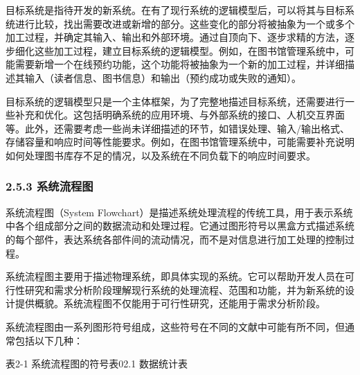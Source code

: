 
目标系统是指待开发的新系统。在有了现行系统的逻辑模型后，可以将其与目标系统进行比较，找出需要改进或新增的部分。这些变化的部分将被抽象为一个或多个加工过程，并确定其输入、输出和外部环境。通过自顶向下、逐步求精的方法，逐步细化这些加工过程，建立目标系统的逻辑模型。例如，在图书馆管理系统中，可能需要新增一个在线预约功能，这个功能将被抽象为一个新的加工过程，并详细描述其输入（读者信息、图书信息）和输出（预约成功或失败的通知）。


目标系统的逻辑模型只是一个主体框架，为了完整地描述目标系统，还需要进行一些补充和优化。这包括明确系统的应用环境、与外部系统的接口、人机交互界面等。此外，还需要考虑一些尚未详细描述的环节，如错误处理、输入/输出格式、存储容量和响应时间等性能要求。例如，在图书馆管理系统中，可能需要补充说明如何处理图书库存不足的情况，以及系统在不同负载下的响应时间要求。

\hypertarget{ux7cfbux7edfux6d41ux7a0bux56fe}{%
\subsubsection{2.5.3 系统流程图}\label{ux7cfbux7edfux6d41ux7a0bux56fe}}

系统流程图（System Flowchart）是描述系统处理流程的传统工具，用于表示系统中各个组成部分之间的数据流动和处理过程。它通过图形符号以黑盒方式描述系统的每个部件，表达系统各部件间的流动情况，而不是对信息进行加工处理的控制过程。


系统流程图主要用于描述物理系统，即具体实现的系统。它可以帮助开发人员在可行性研究和需求分析阶段理解现行系统的处理流程、范围和功能，并为新系统的设计提供概貌。系统流程图不仅能用于可行性研究，还能用于需求分析阶段。


系统流程图由一系列图形符号组成，这些符号在不同的文献中可能有所不同，但通常包括以下几种：

表2-1 系统流程图的符号表02.1 数据统计表

